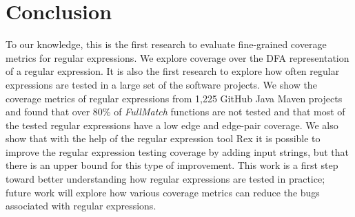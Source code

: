 \section{Conclusion}
\label{sec:conclusion}
To our knowledge, this is the first research to  evaluate fine-grained  coverage metrics for regular expressions. 
We explore coverage over the DFA representation of a regular expression. 
It is also the first research to explore how often regular expressions are tested in a large set of the software projects. 
We show the coverage metrics of regular expressions from 1,225 GitHub Java Maven projects and found that over 80\% of {\em FullMatch} functions are not tested and that most of the tested regular expressions have a low edge and edge-pair coverage. 
We also show that with the help of the regular expression tool Rex it is possible to improve the regular expression testing coverage by adding input strings, but that there is an upper bound for this type of improvement. 
This work is a first step toward better understanding how regular expressions are tested in practice; future work will explore how various coverage metrics can reduce the bugs associated with regular expressions. %




